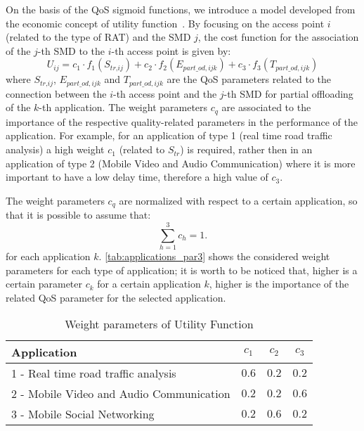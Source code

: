 \documentclass[twoside,openright]{report}
\begin{document}
On the basis of the \gls{QoS} sigmoid functions, we introduce a model developed from the economic concept of utility function~\cite{Lohier}. By focusing on the access point $i$ (related to the type of \gls{RAT}) and the \gls{SMD} $j$, the cost function for the association of the $j$-th \gls{SMD} to the $i$-th access point is given by:
  \begin{equation}
	\label{eq:Utilityfunction}
	\textit{U}_{\textit{ij}} =  c_1\cdot f_1(S_{\textit{tr},\textit{ij}}) + c_2\cdot f_2(E_{\textit{part}\_\textit{od},\textit{ijk}}) + c_3\cdot f_3(T_{\textit{part}\_\textit{od},\textit{ijk}})
	\end{equation}   
where $S_{\textit{tr},\textit{ij}}$, $E_{\textit{part}\_\textit{od},\textit{ijk}}$ and $T_{\textit{part}\_\textit{od},\textit{ijk}}$ are the \gls{QoS} parameters related to the connection between the $i$-th access point and the $j$-th \gls{SMD} for partial offloading of the $k$-th application. 
The weight parameters $c_q$ are associated to the importance of the respective quality-related parameters in the performance of the application. 
For example, for an application of type 1 (real time road traffic analysis) a high weight $c_1$ (related to $S_\textit{tr}$) is required, rather then in an application of type 2 (Mobile Video and Audio Communication) where it is more important to have a low delay time, therefore a high value of $c_{3}$. 

The weight parameters $c_q$ are normalized with respect to a certain application, so that it is possible to assume that:
$$\sum_{h=1}^3 c_h=1.$$
for each application $k$. 
\autoref{tab:applications_par3} shows the considered weight parameters for each type of application; it is worth to be noticed that, higher is a certain parameter $c_k$ for a certain application $k$, higher is the importance of the related \gls{QoS} parameter for the selected application.

\begin{table}[tbp]
\begin{center}
\caption{Weight parameters of Utility Function}
\label{tab:applications_par3}
{
\renewcommand{\arraystretch}{2}
\begin{tabular}{p{8cm}|c|c|c}\hline\hline 
Application & $c_1$ &$c_2$ & $c_3$\\  \hline
1 - Real time road traffic analysis & $0.6$ &$0.2$ & $0.2$  \\ 
2 - Mobile Video and Audio Communication & $0.2$ &$0.2$ & $0.6$ \\ 
3 - Mobile Social Networking& $0.2$ &$0.6$ & $0.2$  \\   \hline
\end{tabular}
}
\end{center}
\end{table}
\end{document}
